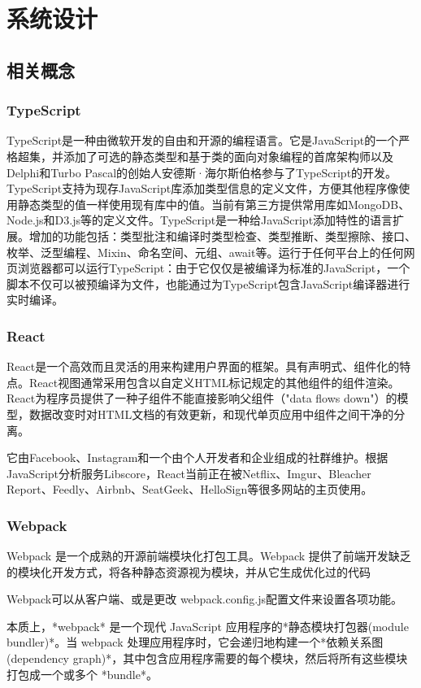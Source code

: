 
\chapter{系统设计}%
\section{相关概念}
\subsection{TypeScript}
TypeScript是一种由微软开发的自由和开源的编程语言。它是JavaScript的一个严格超集，并添加了可选的静态类型和基于类的面向对象编程的首席架构师以及Delphi和Turbo Pascal的创始人安德斯·海尔斯伯格参与了TypeScript的开发。TypeScript支持为现存JavaScript库添加类型信息的定义文件，方便其他程序像使用静态类型的值一样使用现有库中的值。当前有第三方提供常用库如MongoDB、Node.js和D3.js等的定义文件。TypeScript是一种给JavaScript添加特性的语言扩展。增加的功能包括：类型批注和编译时类型检查、类型推断、类型擦除、接口、枚举、泛型编程、Mixin、命名空间、元组、await等。运行于任何平台上的任何网页浏览器都可以运行TypeScript：由于它仅仅是被编译为标准的JavaScript，一个脚本不仅可以被预编译为文件，也能通过为TypeScript包含JavaScript编译器进行实时编译。
\subsection{React}
React是一个高效而且灵活的用来构建用户界面的框架。具有声明式、组件化的特点。React视图通常采用包含以自定义HTML标记规定的其他组件的组件渲染。React为程序员提供了一种子组件不能直接影响父组件（"data flows down"）的模型，数据改变时对HTML文档的有效更新，和现代单页应用中组件之间干净的分离。

它由Facebook、Instagram和一个由个人开发者和企业组成的社群维护。根据JavaScript分析服务Libscore，React当前正在被Netflix、Imgur、Bleacher Report、Feedly、Airbnb、SeatGeek、HelloSign等很多网站的主页使用。
\subsection{Webpack}
Webpack 是一个成熟的开源前端模块化打包工具。Webpack 提供了前端开发缺乏的模块化开发方式，将各种静态资源视为模块，并从它生成优化过的代码

Webpack可以从客户端、或是更改 webpack.config.js配置文件来设置各项功能。

本质上，*webpack* 是一个现代 JavaScript 应用程序的*静态模块打包器(module bundler)*。当 webpack 处理应用程序时，它会递归地构建一个*依赖关系图(dependency graph)*，其中包含应用程序需要的每个模块，然后将所有这些模块打包成一个或多个 *bundle*。

